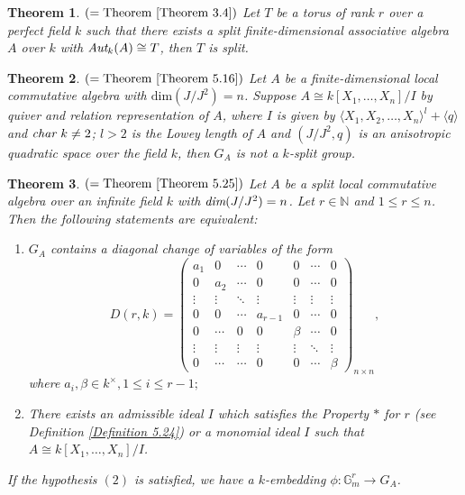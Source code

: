 \documentclass[12pt]{amsart}
\newtheorem{thmI}{Theorem}
\theoremstyle{definition}
\numberwithin{equation}{section}
\begin{document}
\begin{thmI}
$(=\text{Theorem }\ref{Theorem 3.4})$ Let $T$ be a torus of rank $r$ over a perfect field $k$ such that there exists a split finite-dimensional associative algebra $A$ over $k$ with $\emph{\text{Aut}}_k(A)\cong T$, then $T$ is split.   
\end{thmI}
\vskip2mm
\begin{thmI}
$(=\text{Theorem }\ref{Theorem 5.16})$ Let $A$ be a finite-dimensional local commutative algebra with $\text{dim}(J/J^2)=n$. Suppose $A\cong k[X_1,\dots, X_n]/I$ by quiver and relation representation of $A$, where $I$ is given by $\langle X_1, X_2,\dots, X_n\rangle^l+\langle q\rangle$ and $\emph{char }k\neq2$; $l>2$ is the Lowey length of $A$ and $(J/J^2,q)$ is an anisotropic quadratic space over the field $k$, then $G_A$ is not a $k$-split group.
\end{thmI}
\vskip2mm
\begin{thmI}
$(=\text{Theorem } \ref{Theorem 5.25})$ Let $A$ be a split local commutative algebra over an infinite field $k$ with $\emph{dim}(J/J^2)=n$. Let $r\in \mathbb{N}$ and $1\leq r\leq n$. Then the following statements are equivalent:
\begin{enumerate}
    \vskip4mm
    \item $G_A$ contains a diagonal change of variables of the form \[D(r,k)=
\begin{pmatrix}
a_1 & 0 &\cdots & 0 & 0 & \cdots & 0 \\
0 & a_2 & \cdots & 0 & 0 & \cdots & 0\\
\vdots & \vdots & \ddots & \vdots& \vdots & \vdots & \vdots\\
0 & 0 & \cdots & a_{r-1} & 0 &\cdots & 0 \\
0 & \cdots & 0 & 0 & \beta & \cdots & 0\\
\vdots & \vdots & \vdots & \vdots & \vdots & \ddots & \vdots\\
0 & \cdots & \cdots & 0 & 0 & \cdots & \beta
\end{pmatrix}_{n\times n}
,\]
where  $a_{i}, \beta \in k^{\times}, 1\leq i\leq r-1;$
\vskip4mm
     \item There exists an admissible ideal $I$ which satisfies the Property $*$ for $r$ (see Definition \ref{Definition 5.24}) or a monomial ideal $I$ such that $A\cong k[X_1,\dots,X_n]/I$.
\end{enumerate}
\vskip4mm
If the hypothesis $(2)$ is satisfied, we have a $k$-embedding $\phi: \mathbb{G}_m^{r}\rightarrow G_A$. 
\end{thmI}
\end{document}
